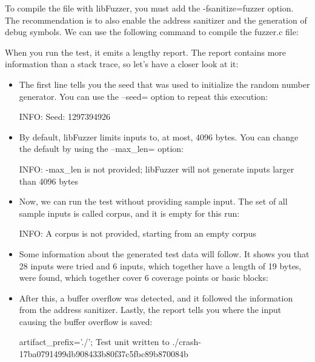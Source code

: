 To compile the file with libFuzzer, you must add the -fsanitize=fuzzer option. The recommendation is to also enable the address sanitizer and the generation of debug symbols. We can use the following command to compile the fuzzer.c file:


When you run the test, it emits a lengthy report. The report contains more information than a stack trace, so let’s have a closer look at it:

\begin{itemize}
\item
The first line tells you the seed that was used to initialize the random number generator. You can use the –seed= option to repeat this execution:

\begin{shell}
INFO: Seed: 1297394926
\end{shell}

\item
By default, libFuzzer limits inputs to, at most, 4096 bytes. You can change the default by using the –max\_len= option:

\begin{shell}
INFO: -max_len is not provided; libFuzzer will not generate
inputs larger than 4096 bytes
\end{shell}

\item
Now, we can run the test without providing sample input. The set of all sample inputs is called corpus, and it is empty for this run:

\begin{shell}
INFO: A corpus is not provided, starting from an empty corpus
\end{shell}

\item
Some information about the generated test data will follow. It shows you that 28 inputs were tried and 6 inputs, which together have a length of 19 bytes, were found, which together cover 6 coverage points or basic blocks:


\item
After this, a buffer overflow was detected, and it followed the information from the address sanitizer. Lastly, the report tells you where the input causing the buffer overflow is saved:

\begin{shell}
artifact_prefix='./'; Test unit written to ./crash-17ba0791499db908433b80f37c5fbc89b870084b
\end{shell}
\end{itemize}

